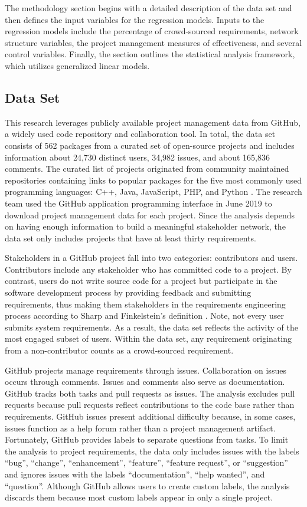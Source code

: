 The methodology section begins with a detailed description of the data set and then defines the input variables for the regression models. Inputs to the regression models include the percentage of crowd-sourced requirements, network structure variables, the project management measures of effectiveness, and several control variables. Finally, the section outlines the statistical analysis framework, which utilizes generalized linear models.

\subsection{Data Set}
\label{data_set_section}

This research leverages publicly available project management data from GitHub, a widely used code repository and collaboration tool. In total, the data set consists of 562 packages from a curated set of open-source projects and includes information about 24,730 distinct users, 34,982 issues, and about 165,836 comments. The curated list of projects originated from community maintained repositories containing links to popular packages for the five most commonly used programming languages: C++, Java, JavaScript, PHP, and Python  \cite{cpp, java, javascript, php, python}. The research team used the GitHub application programming interface in June 2019 to download project management data for each project. Since the analysis depends on having enough information to build a meaningful stakeholder network, the data set only includes projects that have at least thirty requirements.

Stakeholders in a GitHub project fall into two categories: contributors and users. Contributors include any stakeholder who has committed code to a project. By contrast, users do not write source code for a project but participate in the software development process by providing feedback and submitting requirements, thus making them stakeholders in the requirements engineering process according to Sharp and Finkelstein's definition \cite{sharp}. Note, not every user submits system requirements. As a result, the data set reflects the activity of the most engaged subset of users. Within the data set, any requirement originating from a non-contributor counts as a crowd-sourced requirement.

GitHub projects manage requirements through issues. Collaboration on issues occurs through comments. Issues and comments also serve as documentation. GitHub tracks both tasks and pull requests as issues. The analysis excludes pull requests because pull requests reflect contributions to the code base rather than requirements. GitHub issues present additional difficulty because, in some cases, issues function as a help forum rather than a project management artifact. Fortunately, GitHub provides labels to separate questions from tasks. To limit the analysis to project requirements, the data only includes issues with the labels “bug”, “change”, “enhancement”, “feature”, “feature request”, or “suggestion” and ignores issues with the labels “documentation”, “help wanted”, and “question”. Although GitHub allows users to create custom labels, the analysis discards them because most custom labels appear in only a single project.

